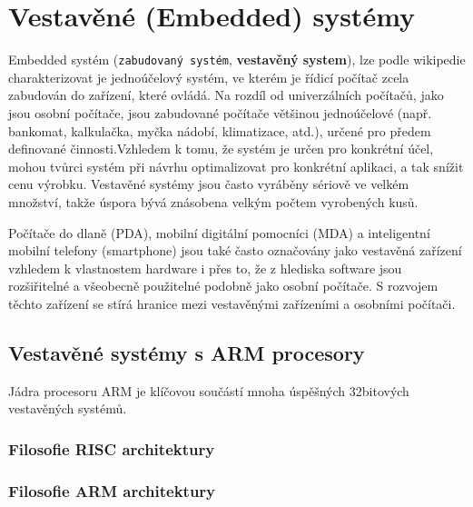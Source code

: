 {
\chapter{Vestavěné (Embedded) systémy}
\minitoc
Embedded systém (\texttt{zabudovaný systém}, \textbf{vestavěný system}), lze podle wikipedie 
charakterizovat je jednoúčelový systém, ve kterém je řídicí počítač zcela zabudován do zařízení, 
které ovládá. Na rozdíl od univerzálních počítačů, jako jsou osobní počítače, jsou zabudované 
počítače většinou jednoúčelové (např. bankomat, kalkulačka, myčka nádobí, klimatizace, atd.), 
určené pro předem definované činnosti.Vzhledem k tomu, že systém je určen pro konkrétní účel, mohou 
tvůrci systém při návrhu optimalizovat pro konkrétní aplikaci, a tak snížit cenu výrobku. Vestavěné 
systémy jsou často vyráběny sériově ve velkém množství, takže úspora bývá znásobena velkým počtem 
vyrobených kusů.

Počítače do dlaně (PDA), mobilní digitální pomocníci (MDA) a inteligentní mobilní telefony 
(smartphone) jsou také často označovány jako vestavěná zařízení vzhledem k vlastnostem hardware i 
přes to, že z hlediska software jsou rozšiřitelné a všeobecně použitelné podobně jako osobní 
počítače. S rozvojem těchto zařízení se stírá hranice mezi vestavěnými zařízeními a osobními 
počítači.

\section{Vestavěné systémy s ARM procesory}
  Jádra procesoru ARM je klíčovou součástí mnoha úspěšných 32bitových vestavěných systémů.
  
  \subsection{Filosofie RISC architektury}
  
  \subsection{Filosofie ARM architektury}
}
